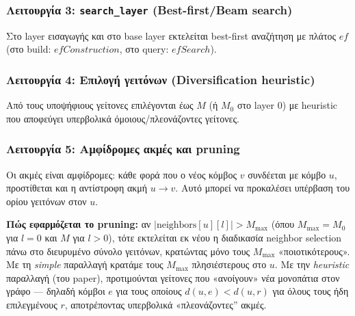 \documentclass[12pt,a4paper]{article}
\begin{document}
\subsubsection{Λειτουργία 3: \texttt{search\_layer} (Best-first/Beam search)}
Στο layer εισαγωγής και στο base layer εκτελείται best-first αναζήτηση με πλάτος $ef$ (στο build: $efConstruction$, στο query: $efSearch$).

\subsubsection{Λειτουργία 4: Επιλογή γειτόνων (Diversification heuristic)}
Από τους υποψήφιους γείτονες επιλέγονται έως $M$ (ή $M_0$ στο layer 0) με heuristic που αποφεύγει υπερβολικά όμοιους/πλεονάζοντες γείτονες.

\subsubsection{Λειτουργία 5: Αμφίδρομες ακμές και pruning}
Οι ακμές είναι αμφίδρομες: κάθε φορά που ο νέος κόμβος $v$ συνδέεται με κόμβο $u$, προστίθεται και η αντίστροφη ακμή $u \to v$. Αυτό μπορεί να προκαλέσει υπέρβαση του ορίου γειτόνων στον $u$.

\textbf{Πώς εφαρμόζεται το pruning:} αν $|\text{neighbors}[u][l]| > M_{\max}$ (όπου $M_{\max} = M_0$ για $l=0$ και $M$ για $l>0$), τότε εκτελείται εκ νέου η διαδικασία neighbor selection πάνω στο διευρυμένο σύνολο γειτόνων, κρατώντας μόνο τους $M_{\max}$ «ποιοτικότερους». Με τη \emph{simple} παραλλαγή κρατάμε τους $M_{\max}$ πλησιέστερους στο $u$. Με την \emph{heuristic} παραλλαγή (του paper), προτιμούνται γείτονες που «ανοίγουν» νέα μονοπάτια στον γράφο — δηλαδή κόμβοι $e$ για τους οποίους $d(u,e) < d(u,r)$ για όλους τους ήδη επιλεγμένους $r$, αποτρέποντας υπερβολικά «πλεονάζοντες'' ακμές.

\end{document}
